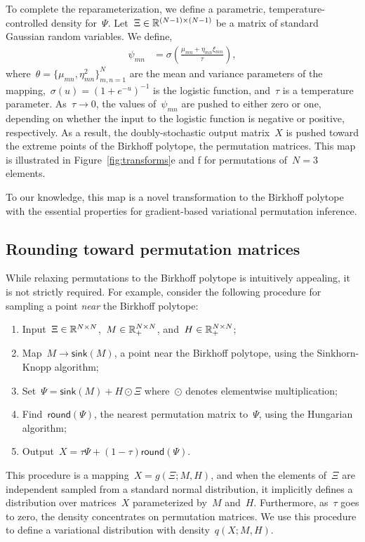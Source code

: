 \documentclass[twoside]{article}
\begin{document}
To complete the reparameterization, we define a parametric,
temperature-controlled density for~$\Psi$.
Let~${\Xi \in \mathbb{R}^{(N-1) \times (N-1)}}$ be a matrix of standard
Gaussian random variables.  We
define,
\begin{align*}
  \psi_{mn} &= \sigma\left( \frac{\mu_{mn} + \eta_{mn} \xi_{mn}}{\tau} \right),
\end{align*}
where~${\theta = \{\mu_{mn}, \eta^2_{mn}\}_{m,n=1}^N}$ are the mean
and variance parameters of the
mapping,~${\sigma(u) = (1+e^{-u})^{-1}}$ is the logistic function,
and~$\tau$ is a temperature parameter. As~$\tau \to 0$, the values
of~$\psi_{mn}$ are pushed to either zero or one, depending on whether
the input to the logistic function is negative or positive,
respectively.  As a result, the doubly-stochastic output matrix~$X$ is
pushed toward the extreme points of the Birkhoff polytope, the
permutation matrices.  This map is illustrated in
Figure~\ref{fig:transforms}e and f for permutations of~${N=3}$
elements.

To our knowledge, this map is a novel transformation to the Birkhoff
polytope with the essential properties for gradient-based variational
permutation inference.

\subsection{Rounding toward permutation matrices}
\label{sub:rounding}

While relaxing permutations to the Birkhoff polytope is intuitively
appealing, it is not strictly required.  For example, consider the
following procedure for sampling a point \emph{near} the Birkhoff
polytope:
\begin{enumerate}[label=(\roman*)]
\item Input~${\Xi \in \mathbb{R}^{N \times N}}$,~${M \in \mathbb{R}_+^{N \times N}}$, and~${H \in \mathbb{R}_+^{N \times N}}$;
\item Map~$M \to \mathsf{sink}(M)$, a point near the Birkhoff polytope, using the Sinkhorn-Knopp algorithm;
\item Set~${\Psi = \mathsf{sink}(M) + H \odot \Xi}$ where~$\odot$ denotes elementwise multiplication;
\item Find~$\mathsf{round}(\Psi)$, the nearest permutation matrix to~$\Psi$, using the Hungarian algorithm;
\item Output~${X = \tau \Psi + (1-\tau) \mathsf{round}(\Psi)}$.
\end{enumerate}
This procedure is a mapping~$X = g(\Xi; M, H)$, and when the elements
of~$\Xi$ are independent sampled from a standard normal distribution,
it implicitly defines a distribution over matrices~$X$ parameterized
by~$M$ and~$H$. Furthermore, as~$\tau$ goes to zero, the density
concentrates on permutation matrices.  We use this procedure to define
a variational distribution with density~$q(X; M, H)$.
\end{document}
